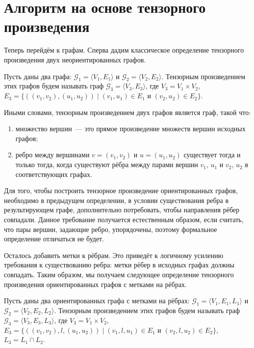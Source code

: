 \section{Алгоритм на основе тензорного произведения}
\label{sec:CFPQ_TensorProduct}


Теперь перейдём к графам.
Сперва дадим классическое определение тензорного произведения двух неориентированных графов.

\begin{definition}
Пусть даны два графа: $\mathcal{G}_1 = \langle V_1, E_1\rangle$ и $\mathcal{G}_2 = \langle V_2, E_2\rangle$.
Тензорным произведением этих графов будем называть граф $\mathcal{G}_3 = \langle V_3, E_3\rangle$, где $V_3 = V_1 \times V_2$, $E_3 = \{ ((v_1,v_2),(u_1,u_2)) \mid (v_1,u_1) \in E_1 \text{ и } (v_2,u_2) \in E_2 \}$.
\end{definition}

Иными словами, тензорным произведением двух графов является граф, такой что:
\begin{enumerate}
 \item множество вершин~--- это прямое произведение множеств вершин исходных графов;
 \item ребро между вершинами $v=(v_1,v_2)$ и $u=(u_1,u_2)$ существует тогда и только тогда, когда существуют рёбра между парами вершин $v_1$, $u_1$ и $v_2$, $u_2$ в соответствующих графах.
\end{enumerate}

Для того, чтобы построить тензорное произведение ориентированных графов, необходимо в предыдущем определении, в условии существования ребра в результирующем графе, дополнительно потребовать, чтобы направления рёбер совпадали.
Данное требование получается естественным образом, если считать, что пары вершин, задающие ребро, упорядочены, поэтому формальное определение отличаться не будет.

Осталось добавить метки к рёбрам.
Это приведёт к логичному усилению требования к существованию ребра: метки рёбер в исходных графах должны совпадать.
Таким образом, мы получаем следующее определение тензорного произведения ориентированных графов с метками на рёбрах.

\begin{definition}
Пусть даны два ориентированных графа с метками на рёбрах: $\mathcal{G}_1 = \langle V_1, E_1, L_1 \rangle$ и $\mathcal{G}_2 = \langle V_2, E_2, L_2 \rangle$.
Тензорным произведением этих графов будем называть граф $\mathcal{G}_3 = \langle V_3, E_3, L_3\rangle$, где $V_3 = V_1 \times V_2$, $E_3 = \{ ((v_1,v_2),l,(u_1,u_2)) \mid (v_1,l,u_1) \in E_1 \text{ и } (v_2,l,u_2) \in E_2 \}$, $L_3=L_1 \cap L_2$.
\end{definition}


